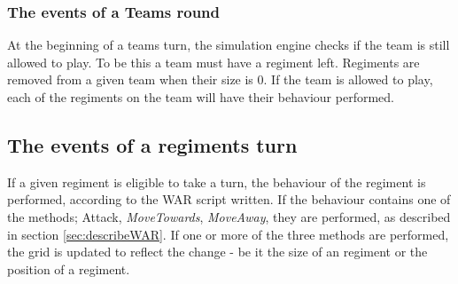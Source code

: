 		\subsubsection{The events of a Teams round}
		At the beginning of a teams turn, the simulation engine checks if the team is still allowed to play. 
		To be this a team must have a regiment left. Regiments are removed from a given team when their size is 0.
		If the team is allowed to play, each of the regiments on the team will have their behaviour performed.
		

		\subsection{The events of a regiments turn}
		If a given regiment is eligible to take a turn, the behaviour of the regiment is performed, 
		according to the WAR script written. If the behaviour contains one of the methods; 
		Attack, \textit{MoveTowards}, \textit{MoveAway}, they are performed, as described in section \ref{sec:describeWAR}. 
		If one or more of the three methods are performed, the grid is updated to reflect the change - 
		be it the size of an regiment or the position of a regiment. 